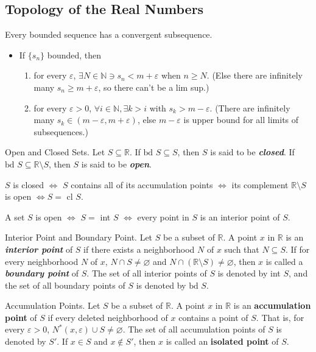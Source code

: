 \documentclass[12pt]{article}
\newcommand\bd[1]{\text{bd }#1}
\newcommand\Real{\mathbb{R}}
\newcommand\Natural{\mathbb{N}}
\newcommand\sube{\subseteq}
\newcommand\pr{\ensuremath{'}}
\begin{document}
\subsection{Topology of the Real Numbers}
\label{sec:orgbd9e85b}
Every bounded sequence has a convergent subsequence.
\begin{itemize}
\item If \(\{s_n\}\) bounded, then
\begin{enumerate}
\item for every \(\varepsilon\), \(\exists N \in \Natural \ni s_n < m + \varepsilon\) when \(n \ge N\).
(Else there are infinitely many \(s_n \ge m + \varepsilon\), so there can't
be a lim sup.)
\item for every \(\varepsilon > 0\), \(\forall i \in \Natural, \exists k>i\) with \(s_k > m - \varepsilon\).
(There are infinitely many \(s_k \in (m-\varepsilon, m+\varepsilon)\), else
\(m-\varepsilon\) is upper bound for all limits of subsequences.)
\end{enumerate}
\end{itemize}

\begin{definition}{Open and Closed Sets.}
  Let $S \sube \Real$. If $\bd{S} \sube S$, then $S$ is said to be
  \textit{\textbf{closed}}. If $\bd{S} \sube \Real \setminus S$, then $S$ is
  said to be \textit{\textbf{open}}.

  $S$ is closed $\iff$ $S$ contains all of its accumulation points $\iff$ its
  complement $\Real \setminus S$ is open $\iff S =$ cl $S$.

  A set $S$ is open $\iff$ $S =$ int $S$ $\iff$ every point in $S$ is an
  interior point of $S$.
\end{definition}

\begin{definition}{Interior Point and Boundary Point.}
  Let $S$ be a subset of $\Real$. A point $x$ in $\Real$ is an
  \textit{\textbf{interior point}} of $S$ if there exists a neighborhood $N$
  of $x$ such that $N \sube S$. If for every neighborhood $N$ of $x$, $N \cap
  S \ne \varnothing$ and $N \cap (\Real \setminus S) \ne \varnothing$, then $x$ is called a
  \textit{\textbf{boundary point}} of $S$. The set of all interior points of
  $S$ is denoted by int $S$, and the set of all boundary points of $S$ is
  denoted by $\bd{S}$.
\end{definition}

\begin{definition}{Accumulation Points.}
  Let $S$ be a subset of $\Real$. A point $x$ in $\Real$ is an
  \textbf{accumulation point} of $S$ if every deleted neighborhood of $x$
  contains a point of $S$. That is, for every $\varepsilon > 0$, $N^{*}(x,\varepsilon) \cup S \ne
  \varnothing$. The set of all accumulation points of $S$ is denoted by
  $S\pr$. If $x\in S$ and $x\notin S\pr$, then $x$ is called an \textbf{isolated
  point} of $S$.
\end{definition}
\end{document}
